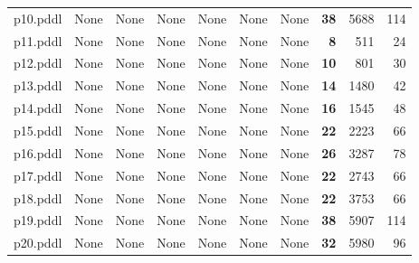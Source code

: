 \documentclass{article}
\begin{document}
\begin{tabular}{@{}lrrrrrrrrr@{}}
p10.pddl & \multicolumn{1}{|l|}{None} & \multicolumn{1}{|l|}{None} & \multicolumn{1}{|l|}{None} & \multicolumn{1}{|l|}{None} & \multicolumn{1}{|l|}{None} & \multicolumn{1}{|l|}{None} & \textbf{38} & 5688 & 114 \\
p11.pddl & \multicolumn{1}{|l|}{None} & \multicolumn{1}{|l|}{None} & \multicolumn{1}{|l|}{None} & \multicolumn{1}{|l|}{None} & \multicolumn{1}{|l|}{None} & \multicolumn{1}{|l|}{None} & \textbf{8} & 511 & 24 \\
p12.pddl & \multicolumn{1}{|l|}{None} & \multicolumn{1}{|l|}{None} & \multicolumn{1}{|l|}{None} & \multicolumn{1}{|l|}{None} & \multicolumn{1}{|l|}{None} & \multicolumn{1}{|l|}{None} & \textbf{10} & 801 & 30 \\
p13.pddl & \multicolumn{1}{|l|}{None} & \multicolumn{1}{|l|}{None} & \multicolumn{1}{|l|}{None} & \multicolumn{1}{|l|}{None} & \multicolumn{1}{|l|}{None} & \multicolumn{1}{|l|}{None} & \textbf{14} & 1480 & 42 \\
p14.pddl & \multicolumn{1}{|l|}{None} & \multicolumn{1}{|l|}{None} & \multicolumn{1}{|l|}{None} & \multicolumn{1}{|l|}{None} & \multicolumn{1}{|l|}{None} & \multicolumn{1}{|l|}{None} & \textbf{16} & 1545 & 48 \\
p15.pddl & \multicolumn{1}{|l|}{None} & \multicolumn{1}{|l|}{None} & \multicolumn{1}{|l|}{None} & \multicolumn{1}{|l|}{None} & \multicolumn{1}{|l|}{None} & \multicolumn{1}{|l|}{None} & \textbf{22} & 2223 & 66 \\
p16.pddl & \multicolumn{1}{|l|}{None} & \multicolumn{1}{|l|}{None} & \multicolumn{1}{|l|}{None} & \multicolumn{1}{|l|}{None} & \multicolumn{1}{|l|}{None} & \multicolumn{1}{|l|}{None} & \textbf{26} & 3287 & 78 \\
p17.pddl & \multicolumn{1}{|l|}{None} & \multicolumn{1}{|l|}{None} & \multicolumn{1}{|l|}{None} & \multicolumn{1}{|l|}{None} & \multicolumn{1}{|l|}{None} & \multicolumn{1}{|l|}{None} & \textbf{22} & 2743 & 66 \\
p18.pddl & \multicolumn{1}{|l|}{None} & \multicolumn{1}{|l|}{None} & \multicolumn{1}{|l|}{None} & \multicolumn{1}{|l|}{None} & \multicolumn{1}{|l|}{None} & \multicolumn{1}{|l|}{None} & \textbf{22} & 3753 & 66 \\
p19.pddl & \multicolumn{1}{|l|}{None} & \multicolumn{1}{|l|}{None} & \multicolumn{1}{|l|}{None} & \multicolumn{1}{|l|}{None} & \multicolumn{1}{|l|}{None} & \multicolumn{1}{|l|}{None} & \textbf{38} & 5907 & 114 \\
p20.pddl & \multicolumn{1}{|l|}{None} & \multicolumn{1}{|l|}{None} & \multicolumn{1}{|l|}{None} & \multicolumn{1}{|l|}{None} & \multicolumn{1}{|l|}{None} & \multicolumn{1}{|l|}{None} & \textbf{32} & 5980 & 96 \\
\end{tabular}
\end{document}
